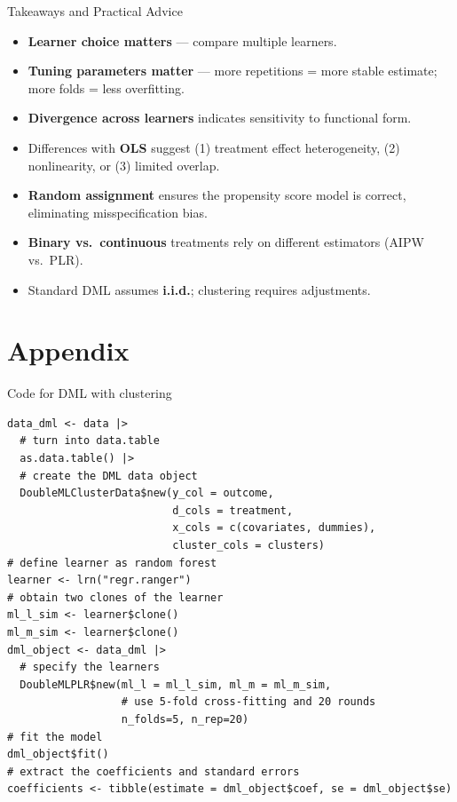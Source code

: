 \documentclass[10pt,table,aspectratio=169]{beamer}
\begin{document}
\begin{frame}[plain, label = two_dimensions]{Takeaways and Practical Advice}

\begin{itemize}
  \item \alert{\bf Learner choice matters} --- compare multiple learners.  \medskip \pause
    \item \alert{\bf Tuning parameters matter} --- more repetitions = more stable estimate; more folds = less overfitting.  \medskip \pause
  \item \alert{\bf Divergence across learners} indicates sensitivity to functional form.   \medskip \pause
  \item Differences with \alert{\bf OLS} suggest (1) \alert{treatment effect heterogeneity}, (2) \alert{nonlinearity}, or (3) \alert{limited overlap}.  \medskip \pause
  \item \alert{\bf Random assignment} ensures the propensity score model is correct, eliminating \alert{misspecification bias}. \medskip \pause
  \item \alert{\bf Binary vs.\ continuous} treatments rely on different estimators (\alert{AIPW} vs.\ \alert{PLR}).  \medskip \pause
  \item Standard DML assumes \alert{\bf i.i.d.}; clustering requires adjustments.  
 
\end{itemize}

\end{frame}



\section{Appendix}

\begin{frame}[plain,fragile,label=two_dimensions]{Code for DML with clustering}
\begin{verbatim}
data_dml <- data |>
  # turn into data.table
  as.data.table() |>
  # create the DML data object
  DoubleMLClusterData$new(y_col = outcome,
                          d_cols = treatment,
                          x_cols = c(covariates, dummies),
                          cluster_cols = clusters)
# define learner as random forest
learner <- lrn("regr.ranger")
# obtain two clones of the learner
ml_l_sim <- learner$clone()
ml_m_sim <- learner$clone()
dml_object <- data_dml |>
  # specify the learners
  DoubleMLPLR$new(ml_l = ml_l_sim, ml_m = ml_m_sim,
                  # use 5-fold cross-fitting and 20 rounds
                  n_folds=5, n_rep=20)
# fit the model
dml_object$fit()
# extract the coefficients and standard errors
coefficients <- tibble(estimate = dml_object$coef, se = dml_object$se)
\end{verbatim}
\end{frame}
\end{document}
